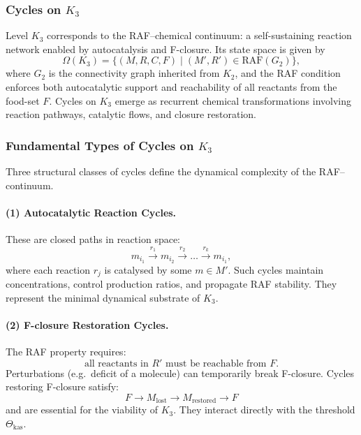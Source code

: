 
\subsubsection{Cycles on \texorpdfstring{$K_3$}{K_3}}
\label{sec:cycles-k3}

Level $K_3$ corresponds to the RAF–chemical continuum: 
a self-sustaining reaction network enabled by autocatalysis and
F-closure.  
Its state space is given by
\[
  \Omega(K_3) = \{(M,R,C,F)\mid (M',R')\in \mathrm{RAF}(G_2)\},
\]
where $G_2$ is the connectivity graph inherited from $K_2$,
and the RAF condition enforces both autocatalytic support and reachability
of all reactants from the food-set $F$.
Cycles on $K_3$ emerge as recurrent chemical transformations involving
reaction pathways, catalytic flows, and closure restoration.

\subsubsection{Fundamental Types of Cycles on \texorpdfstring{$K_3$}{K_3}}

Three structural classes of cycles define the dynamical complexity of
the RAF–continuum.

\paragraph{(1) Autocatalytic Reaction Cycles.}

These are closed paths in reaction space:
\[
  m_{i_1}\xrightarrow{r_1} m_{i_2}
    \xrightarrow{r_2} \dots
    \xrightarrow{r_k} m_{i_1},
\]
where each reaction $r_j$ is catalysed by some $m\in M'$.
Such cycles maintain concentrations, control production ratios, and
propagate RAF stability.
They represent the minimal dynamical substrate of $K_3$.

\paragraph{(2) F-closure Restoration Cycles.}

The RAF property requires:
\[
  \text{all reactants in } R' \text{ must be reachable from } F.
\]
Perturbations (e.g.\ deficit of a molecule) can temporarily break
F-closure.
Cycles restoring F-closure satisfy:
\[
  F \to M_{\mathrm{lost}} \to M_{\mathrm{restored}} \to F
\]
and are essential for the viability of $K_3$.
They interact directly with the threshold $\Theta_{\mathrm{kas}}$.

